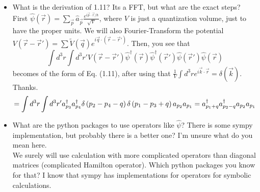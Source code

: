 \begin{itemize}
        \item What is the derivation of 1.11? Its a FFT, but what are the exact steps?
            {\color{red}
                First $\hat\psi(\vec r)=\sum_{\vec p} \hat a_{\vec p}\frac{e^{i\vec p\cdot\vec r/\hbar}}{\sqrt{V}}$, where $V$ is just a quantization volume, just to have the proper units.
                We will also Fourier-Transform the potential $V(\vec r-\vec r')=\sum \tilde V(\vec q)e^{i\vec q\cdot (\vec r-\vec r')}$. Then, you see that
                $$
                \int d^3r \int d^3r' V(\vec r-\vec r') \hat\psi^\dag(\vec r) \hat\psi^\dag(\vec r')\hat\psi(\vec r')\hat\psi(\vec r)
                $$
                becomes of the form of Eq. (1.11), after using that $\frac{1}{V} \int d^3 r e^{i\vec k\cdot \vec r}=\delta(\vec k)$.
            }
            {\color{green}
                Thanks.
                \begin{equation*}
                  = \int d^3r \int d^3r' a_{p_{3}}^{\dagger} a_{p_{4}}^{\dagger} \delta\left(p_{2} - p_{4} - q\right) \delta\left(p_{1} - p_{3} + q\right) a_{p_{2}} a_{p_{1}} \\
                  = a_{p_{1} + q}^{\dagger} a_{p_{2} - q}^{\dagger} a_{p_{2}} a_{p_{1}} \\
                \end{equation*}
            }

        \item What are the python packages to use operators like $\hat{\psi}$? There is some sympy implementation, but probably there is a better one?
        {\color{red}
            I'm unsure what do you mean here. \\
        }
        {\color{green}
            We surely will use calculation with more complicated operators than diagonal matrices (complicated Hamilton operator). Which python packages you know for that? I know that sympy has implementations for operators for symbolic calculations.
        }
               

\end{itemize}

